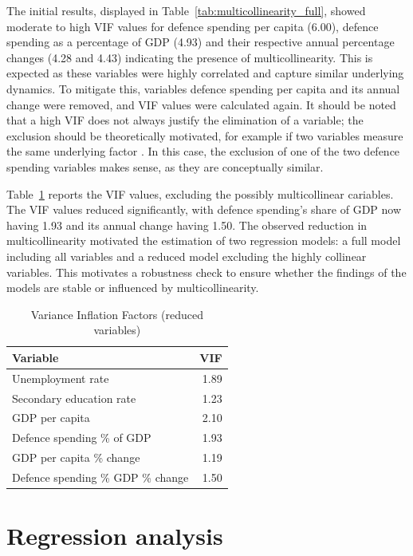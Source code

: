 The initial results, displayed in Table~\ref{tab:multicollinearity_full}, showed moderate to high VIF values for defence spending per capita (6.00), 
defence spending as a percentage of GDP (4.93) and their respective annual percentage changes (4.28 and 4.43)
indicating the presence of multicollinearity. This is expected as these variables were highly correlated 
and capture similar underlying dynamics.
To mitigate 
this, variables defence spending per capita and its annual change were removed, and VIF values 
were calculated again.
It should be noted that a high VIF does not always justify the elimination of a variable;  
the exclusion should be theoretically motivated, for example if two variables measure 
the same underlying factor \parencite{obrien_caution_2007}. In this case, the 
exclusion of one of the two defence spending variables makes sense, as they are conceptually similar.

Table~\ref{tab:multicollinearity_reduced} reports the VIF values, excluding the possibly multicollinear 
cariables.
The VIF values reduced significantly, with defence spending's share of GDP now having 
1.93 and its annual change having 1.50. The observed reduction in multicollinearity motivated the 
estimation of two regression models: a full model including all variables and a reduced model 
excluding the highly collinear variables. This motivates a robustness check to ensure whether 
the findings of the models are stable or influenced by multicollinearity.

\begin{table}[ht]
\caption{Variance Inflation Factors (reduced variables)}
\small
\centering
\begin{tabularx}{\textwidth}{l r}
\toprule
\textbf{Variable} & \textbf{VIF} \\
\midrule
Unemployment rate & 1.89 \\
Secondary education rate & 1.23 \\
GDP per capita & 2.10 \\
Defence spending \% of GDP & 1.93 \\
GDP per capita \% change & 1.19 \\
Defence spending \% GDP \% change & 1.50 \\
\bottomrule
\end{tabularx}
\label{tab:multicollinearity_reduced}
\end{table}

\section{Regression analysis}

